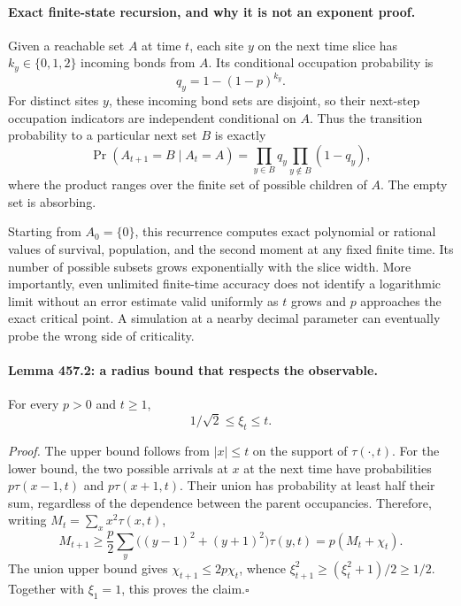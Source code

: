 \documentclass[11pt]{article}
\begin{document}
\paragraph{Exact finite-state recursion, and why it is not an exponent proof.}
Given a reachable set $A$ at time $t$, each site $y$ on the next time
slice has $k_y\in\{0,1,2\}$ incoming bonds from $A$. Its conditional
occupation probability is
\[
 q_y=1-(1-p)^{k_y}.
\]
For distinct sites $y$, these incoming bond sets are disjoint, so their
next-step occupation indicators are independent conditional on $A$.
Thus the transition probability to a particular next set $B$ is exactly
\begin{equation}\label{a457:transfer}
 \Pr(A_{t+1}=B\mid A_t=A)
 =\prod_{y\in B}q_y\prod_{y\notin B}(1-q_y),
\end{equation}
where the product ranges over the finite set of possible children of $A$.
The empty set is absorbing.

Starting from $A_0=\{0\}$, this recurrence computes exact polynomial
or rational values of survival, population, and the second moment at any
fixed finite time. Its number of possible subsets grows exponentially
with the slice width. More importantly, even unlimited finite-time
accuracy does not identify a logarithmic limit without an error estimate
valid uniformly as $t$ grows and $p$ approaches the exact critical point.
A simulation at a nearby decimal parameter can eventually probe the
wrong side of criticality.

\paragraph{Lemma 457.2: a radius bound that respects the observable.}
For every $p>0$ and $t\ge1$,
\begin{equation}\label{a457:radiusbounds}
 1/\sqrt2\le\xi_t\le t.
\end{equation}

\emph{Proof.} The upper bound follows from $|x|\le t$ on the support
of $\tau(\cdot,t)$. For the lower bound, the two possible arrivals at
$x$ at the next time have probabilities $p\tau(x-1,t)$ and
$p\tau(x+1,t)$. Their union has probability at least half their sum,
regardless of the dependence between the parent occupancies. Therefore,
writing $M_t=\sum_xx^2\tau(x,t)$,
\[
 M_{t+1}\ge\frac p2\sum_y\bigl((y-1)^2+(y+1)^2\bigr)\tau(y,t)
             =p(M_t+\chi_t).
\]
The union upper bound gives $\chi_{t+1}\le2p\chi_t$, whence
$\xi_{t+1}^2\ge(\xi_t^2+1)/2\ge1/2$.
Together with $\xi_1=1$, this proves the claim.\hfill$\square$
\end{document}
